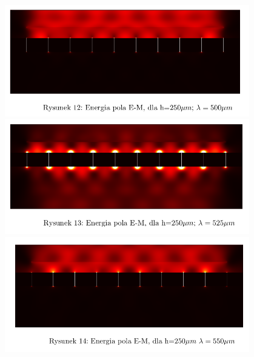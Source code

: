 \documentclass{beamer}
\begin{document}
\begin{frame}
	\begin{columns}
		\begin{column}{0.5\textwidth}
			\begin{figure}[htb]
				\includegraphics[width=\textwidth]{../images/antenaThz/con_src_l500.png}\\
				\includegraphics[width=\textwidth]{../images/antenaThz/con_src_l525.png}\\
				\includegraphics[width=\textwidth]{../images/antenaThz/con_src_l550.png}\\
			\end{figure}
		\end{column}
		\begin{column}{0.5\textwidth}

\end{column}
\end{columns}
\end{frame}
\end{document}

